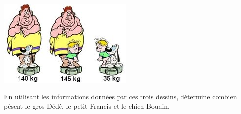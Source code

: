 
\begin{center}
 \includegraphics[scale=0.5]{EO-11.jpg}
 \end{center} 

En utilisant les informations données par ces trois dessins, détermine combien pèsent le gros Dédé, le petit Francis et
le chien Boudin.